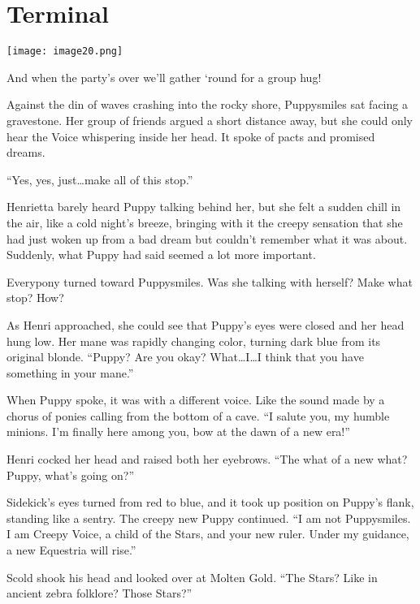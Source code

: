 
\chapter{Terminal}

\texttt{[image: image20.png]}

\begin{intro}
And when the party's over we'll gather `round for a group hug!
\end{intro}


Against the din of waves crashing into the rocky shore, Puppysmiles sat facing a gravestone. Her group of friends argued a short distance away, but she could only hear the Voice whispering inside her head. It spoke of pacts and promised dreams.

``Yes, yes, just\dots make all of this stop.''

Henrietta barely heard Puppy talking behind her, but she felt a sudden chill in the air, like a cold night's breeze, bringing with it the creepy sensation that she had just woken up from a bad dream but couldn't remember what it was about. Suddenly, what Puppy had said seemed a lot more important.

Everypony turned toward Puppysmiles. Was she talking with herself? Make what stop? How?

As Henri approached, she could see that Puppy's eyes were closed and her head hung low. Her mane was rapidly changing color, turning dark blue from its original blonde. ``Puppy? Are you okay? What\dots I\dots I think that you have something in your mane.''

When Puppy spoke, it was with a different voice. Like the sound made by a chorus of ponies calling from the bottom of a cave. ``I salute you, my humble minions. I'm finally here among you, bow at the dawn of a new era!''

Henri cocked her head and raised both her eyebrows. ``The what of a new what? Puppy, what's going on?''

Sidekick's eyes turned from red to blue, and it took up position on Puppy's flank, standing like a sentry. The creepy new Puppy continued. ``I am not Puppysmiles. I am Creepy Voice, a child of the Stars, and your new ruler. Under my guidance, a new Equestria will rise.''

Scold shook his head and looked over at Molten Gold. ``The Stars? Like in ancient zebra folklore? Those Stars?''

